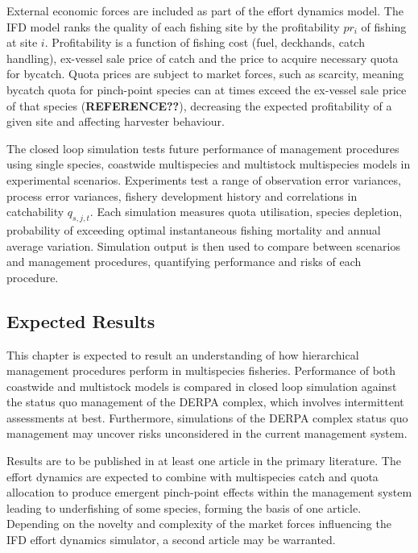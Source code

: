 \documentclass[12pt,]{scrartcl}
\begin{document}
External economic forces are included as part of the effort dynamics
model. The IFD model ranks the quality of each fishing site by the
profitability \(pr_i\) of fishing at site \(i\). Profitability is a
function of fishing cost (fuel, deckhands, catch handling), ex-vessel
sale price of catch and the price to acquire necessary quota for
bycatch. Quota prices are subject to market forces, such as scarcity,
meaning bycatch quota for pinch-point species can at times exceed the
ex-vessel sale price of that species (\textbf{REFERENCE??}), decreasing
the expected profitability of a given site and affecting harvester
behaviour.

The closed loop simulation tests future performance of management
procedures using single species, coastwide multispecies and multistock
multispecies models in experimental scenarios. Experiments test a range
of observation error variances, process error variances, fishery
development history and correlations in catchability \(q_{s,j,t}\). Each
simulation measures quota utilisation, species depletion, probability of
exceeding optimal instantaneous fishing mortality and annual average
variation. Simulation output is then used to compare between scenarios
and management procedures, quantifying performance and risks of each
procedure.

\subsection{Expected Results}\label{expected-results-2}

This chapter is expected to result an understanding of how hierarchical
management procedures perform in multispecies fisheries. Performance of
both coastwide and multistock models is compared in closed loop
simulation against the status quo management of the DERPA complex, which
involves intermittent assessments at best. Furthermore, simulations of
the DERPA complex status quo management may uncover risks unconsidered
in the current management system.

Results are to be published in at least one article in the primary
literature. The effort dynamics are expected to combine with
multispecies catch and quota allocation to produce emergent pinch-point
effects within the management system leading to underfishing of some
species, forming the basis of one article. Depending on the novelty and
complexity of the market forces influencing the IFD effort dynamics
simulator, a second article may be warranted.
\end{document}
